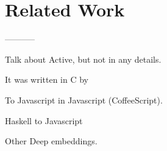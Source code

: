  
\section{Related Work}

-----------

Talk about Active, but not in any details.


 It was written
in C by 

To Javascript in Javascript (CoffeeScript).

Haskell to Javascript

Other Deep embeddings.





